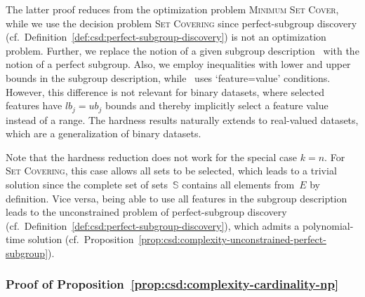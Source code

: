 \documentclass{article}
\theoremstyle{definition}
\begin{document}
The latter proof reduces from the optimization problem \textsc{Minimum Set Cover}, while we use the decision problem \textsc{Set Covering} since perfect-subgroup discovery (cf.~Definition~\ref{def:csd:perfect-subgroup-discovery}) is not an optimization problem.
Further, we replace the notion of a given subgroup description~\cite{boley2009non} with the notion of a perfect subgroup.
Also, we employ inequalities with lower and upper bounds in the subgroup description, while \cite{boley2009non}~uses `feature=value' conditions.
However, this difference is not relevant for binary datasets, where selected features have $\mathit{lb}_j = \mathit{ub}_j$ bounds and thereby implicitly select a feature value instead of a range.
The hardness results naturally extends to real-valued datasets, which are a generalization of binary datasets.

Note that the hardness reduction does not work for the special case $k=n$.
For \textsc{Set Covering}, this case allows all sets to be selected, which leads to a trivial solution since the complete set of sets~$\mathbb{S}$ contains all elements from~$E$ by definition.
Vice versa, being able to use all features in the subgroup description leads to the unconstrained problem of perfect-subgroup discovery (cf.~Definition~\ref{def:csd:perfect-subgroup-discovery}), which admits a polynomial-time solution (cf.~Proposition~\ref{prop:csd:complexity-unconstrained-perfect-subgroup}).

\subsubsection{Proof of Proposition~\ref{prop:csd:complexity-cardinality-np}}
\label{sec:csd:appendix:proofs:complexity-cardinality-np}
\end{document}
